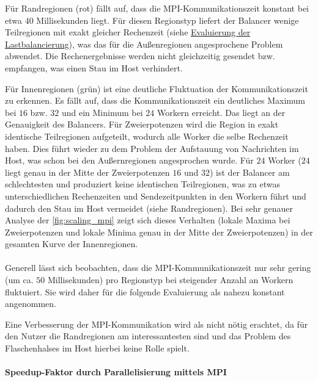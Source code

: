 Für Randregionen (rot) fällt auf, dass die MPI-Kommunikationszeit konstant bei etwa \( 40 \) Millisekunden liegt.
Für diesen Regionstyp liefert der Balancer wenige Teilregionen mit exakt gleicher Rechenzeit (siehe \hyperref[sec:lastbalancierung_eval]{Evaluierung der Lastbalancierung}), was das für die Außenregionen angesprochene Problem abwendet. Die Rechenergebnisse werden nicht gleichzeitig gesendet bzw. empfangen, was einen Stau im Host verhindert.

Für Innenregionen (grün) ist eine deutliche Fluktuation der Kommunikationszeit zu erkennen.
Es fällt auf, dass die Kommunikationszeit ein deutliches Maximum bei \( 16 \) bzw. \( 32 \) und ein Minimum bei \( 24 \) Workern erreicht. Das liegt an der Genauigkeit des Balancers.
Für Zweierpotenzen wird die Region in exakt identische Teilregionen aufgeteilt, wodurch alle Worker die selbe Rechenzeit haben. Dies führt wieder zu dem Problem der Aufstauung von Nachrichten im Host, was schon bei den Außernregionen angesprochen wurde.
Für \( 24 \) Worker (\( 24 \) liegt genau in der Mitte der Zweierpotenzen \( 16 \) und \( 32 \)) ist der Balancer am schlechtesten und produziert keine identischen Teilregionen, was zu etwas unterschiedlichen Rechenzeiten und Sendezeitpunkten in den Workern führt und dadurch den Stau im Host vermeidet (siehe Randregionen).
Bei sehr genauer Analyse der \autoref{fig:scaling_mpi} zeigt sich dieses Verhalten (lokale Maxima bei Zweierpotenzen und lokale Minima genau in der Mitte der Zweierpotenzen) in der gesamten Kurve der Innenregionen.
\\
\\
Generell lässt sich beobachten, dass die MPI-Kommunikationszeit nur sehr gering (um ca. \( 50 \) Millisekunden) pro Regionstyp bei steigender Anzahl an Workern fluktuiert. Sie wird daher für die folgende Evaluierung als nahezu konstant angenommen.

Eine Verbesserung der MPI-Kommunikation wird als nicht nötig erachtet, da für den Nutzer die Randregionen am interessantesten sind und das Problem des Flaschenhalses im Host hierbei keine Rolle spielt.

\paragraph{Speedup-Faktor durch Parallelisierung mittels MPI}

